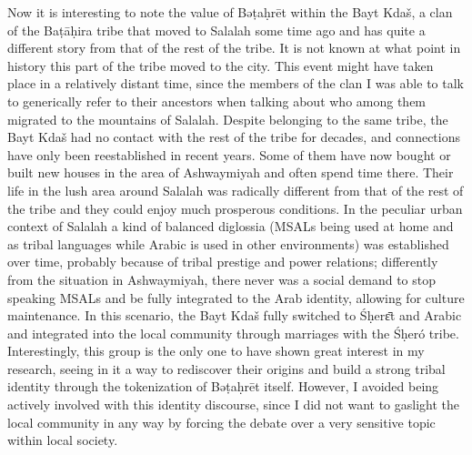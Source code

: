 \documentclass[output=paper]{langscibook}
\begin{document}
Now it is interesting to note the value of Bəṭaḥrēt within the Bayt Kdaš, a clan of the Baṭāḥira tribe that moved to Salalah some time ago and has quite a different story from that of the rest of the tribe. It is not known at what point in history this part of the tribe moved to the city. This event might have taken place in a relatively distant time, since the members of the clan I was able to talk to generically refer to their ancestors when talking about who among them migrated to the mountains of Salalah. Despite belonging to the same tribe, the Bayt Kdaš had no contact with the rest of the tribe for decades, and connections have only been reestablished in recent years. Some of them have now bought or built new houses in the area of Ashwaymiyah and often spend time there. Their life in the lush area around Salalah was radically different from that of the rest of the tribe and they could enjoy much prosperous conditions. In the peculiar urban context of Salalah a kind of balanced diglossia (MSALs being used at home and as tribal languages while Arabic is used in other environments) was established over time, probably because of tribal prestige and power relations; differently from the situation in Ashwaymiyah, there never was a social demand to stop speaking MSALs and be fully integrated to the Arab identity, allowing for culture maintenance. In this scenario, the Bayt Kdaš fully switched to Śḥerɛ̄t and Arabic and integrated into the local community through marriages with the Śḥeró tribe. Interestingly, this group is the only one to have shown great interest in my research, seeing in it a way to rediscover their origins and build a strong tribal identity through the tokenization of Bəṭaḥrēt itself. However, I avoided being actively involved with this identity discourse, since I did not want to gaslight the local community in any way by forcing the debate over a very sensitive topic within local society.
\end{document}
